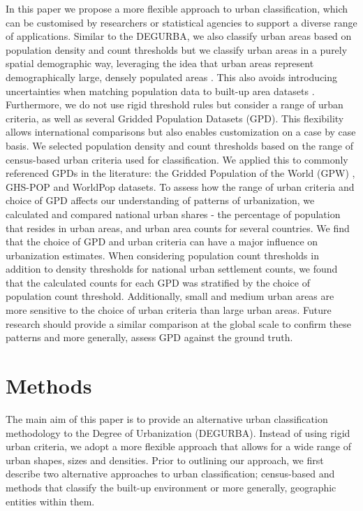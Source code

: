 \documentclass[review]{elsarticle}
\begin{document}
	
	In this paper we propose a more flexible approach to urban classification, which can be customised by researchers or statistical agencies to support a diverse range of applications. 
	Similar to the DEGURBA, we also classify urban areas based on population density and count thresholds but we classify urban areas in a purely spatial demographic way, leveraging the idea that urban areas represent demographically large, densely populated areas \cite{Foxetal2017}.
	This also avoids introducing uncertainties when matching population data to built-up area datasets \cite{Dijkstra2020}.
	Furthermore, we do not use rigid threshold rules but consider a range of urban criteria, as well as several Gridded Population Datasets (GPD).
	This flexibility allows international comparisons but also enables customization on a case by case basis.
	We selected population density and count thresholds based on the range of census-based urban criteria used for classification.
	We applied this to commonly referenced GPDs in the literature: the Gridded Population of the World (GPW) \cite{GPW2016}, GHS-POP \cite{GHSPOP2019} and WorldPop \cite{WorldPop2018} datasets. 
	To assess how the range of urban criteria and choice of GPD affects our understanding of patterns of urbanization, we calculated and compared national urban shares - the percentage of population that resides in urban areas, and urban area counts for several countries.
	We find that the choice of GPD and urban criteria can have a major influence on urbanization estimates.
	When considering population count thresholds in addition to density thresholds for national urban settlement counts, we found that the calculated counts for each GPD was stratified by the choice of population count threshold.
	Additionally, small and medium urban areas are more sensitive to the choice of urban criteria than large urban areas.
	Future research should provide a similar comparison at the global scale to confirm these patterns and more generally, assess GPD against the ground truth.
	
	
	\section{Methods}
	The main aim of this paper is to provide an alternative urban classification methodology to the Degree of Urbanization (DEGURBA).
	Instead of using rigid urban criteria, we adopt a more flexible approach that allows for a wide range of urban shapes, sizes and densities. 
	Prior to outlining our approach, we first describe two alternative approaches to urban classification; census-based and methods that classify the built-up environment or more generally, geographic entities within them.
	
\end{document}
